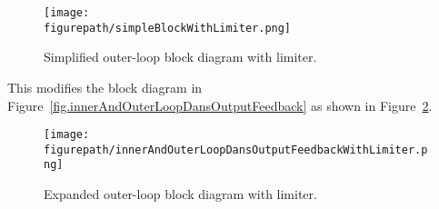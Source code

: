 \begin{figure}[H]
  \begin{center}
    \texttt{[image: \\figurepath/simpleBlockWithLimiter.png]}
    \vspace{-0.1in}
    \caption{Simplified outer-loop block diagram with limiter.\label{fig.simpleBlockWithLimiter}}
  \end{center}
\end{figure}

This modifies the block diagram in Figure~\ref{fig.innerAndOuterLoopDansOutputFeedback} as shown in Figure~\ref{fig.innerAndOuterLoopDansOutputFeedbackWithLimiter}.

\begin{figure}[H]
  \begin{center}
    \texttt{[image: \\figurepath/innerAndOuterLoopDansOutputFeedbackWithLimiter.png]}
    \vspace{-0.1in}
    \caption{Expanded outer-loop block diagram with limiter.\label{fig.innerAndOuterLoopDansOutputFeedbackWithLimiter}}
  \end{center}
\end{figure}

